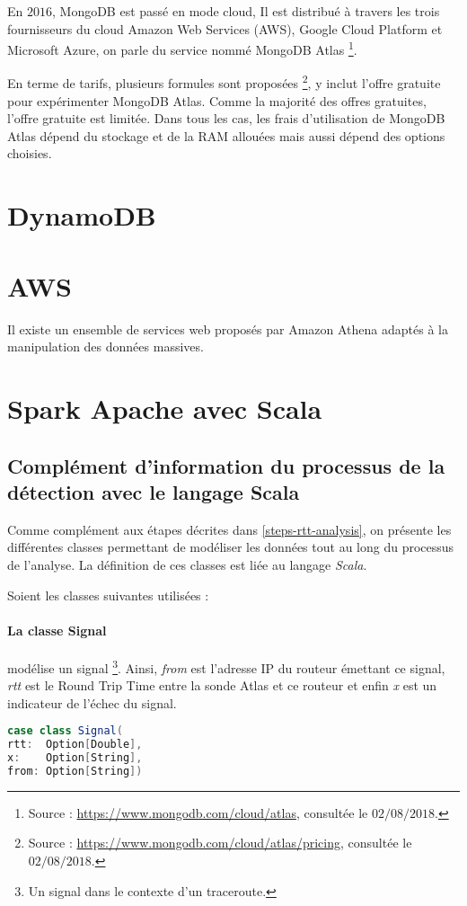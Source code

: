 En $ 2016 $, MongoDB est passé en mode cloud,  Il est distribué à travers les trois fournisseurs du cloud  Amazon Web Services (AWS), Google Cloud Platform et Microsoft Azure, on parle du service nommé  MongoDB Atlas \footnote{Source : \url{https://www.mongodb.com/cloud/atlas}, consultée le $ 02/08/2018 $.}. 

En terme de tarifs, plusieurs formules sont proposées \footnote{Source : \url{https://www.mongodb.com/cloud/atlas/pricing}, consultée le $ 02/08/2018 $.}, y inclut l'offre gratuite pour expérimenter MongoDB Atlas. Comme la majorité des offres gratuites, l'offre gratuite est limitée.  Dans tous les cas, les frais d'utilisation de MongoDB Atlas dépend du stockage et de la  RAM allouées mais aussi dépend des options choisies.




\section{DynamoDB}

\section{AWS}

Il existe un ensemble de services web proposés par Amazon Athena adaptés à la manipulation des données massives. 


\section{Spark Apache avec Scala}

\subsection{Complément d'information du processus de la détection avec le langage Scala}
Comme complément aux étapes décrites dans \ref{steps-rtt-analysis}, on présente les différentes classes permettant de modéliser les données tout au long du processus de l'analyse. La définition de ces classes est liée au langage \textit{Scala}. 

Soient les classes suivantes utilisées : 

\paragraph{La classe Signal} modélise un signal \footnote{Un signal dans le contexte d'un traceroute.}. Ainsi, \textit{from} est l'adresse IP du routeur émettant ce signal, \textit{rtt} est le Round Trip Time entre la sonde Atlas et ce routeur et enfin \textit{x} est un indicateur de l'échec du signal.
\begin{lstlisting}[language=scala]
case class Signal(
rtt:  Option[Double],
x:    Option[String],
from: Option[String])
\end{lstlisting}

